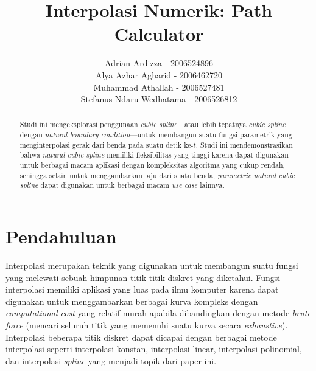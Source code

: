 \documentclass[journal,12pt,onecolumn,a4paper]{IEEEtran}
\begin{document}
\begin{titlepage}
	\title{Interpolasi Numerik: Path Calculator}



	\author{Adrian Ardizza - 2006524896\\
		Alya Azhar Agharid - 2006462720\\
		Muhammad Athallah - 2006527481\\
		Stefanus Ndaru Wedhatama - 2006526812
	}

	\maketitle
	\begin{abstract}
		Studi ini mengeksplorasi penggunaan \emph{cubic spline}---atau lebih tepatnya \emph{cubic spline} dengan \emph{natural boundary condition}---untuk membangun suatu fungsi parametrik yang menginterpolasi gerak dari benda pada suatu detik ke-\(t\). Studi ini mendemonstrasikan bahwa \emph{natural cubic spline} memiliki fleksibilitas yang tinggi karena dapat digunakan untuk berbagai macam aplikasi dengan kompleksitas algoritma yang cukup rendah, sehingga selain untuk menggambarkan laju dari suatu benda, \emph{parametric natural cubic spline} dapat digunakan untuk berbagai macam \emph{use case} lainnya.
	\end{abstract}
	\tableofcontents
	\listoffigures
\end{titlepage}

\IEEEpeerreviewmaketitle

\section{Pendahuluan}
Interpolasi merupakan teknik yang digunakan untuk membangun suatu fungsi yang melewati sebuah himpunan titik-titik diskret yang diketahui. Fungsi interpolasi memiliki aplikasi yang luas pada ilmu komputer karena dapat digunakan untuk menggambarkan berbagai kurva kompleks dengan \emph{computational cost} yang relatif murah apabila dibandingkan dengan metode \emph{brute force} (mencari seluruh titik yang memenuhi suatu kurva secara \emph{exhaustive}). Interpolasi beberapa titik diskret dapat dicapai dengan berbagai metode interpolasi seperti interpolasi konstan, interpolasi linear, interpolasi polinomial, dan interpolasi \emph{spline} yang menjadi topik dari paper ini.
\end{document}
